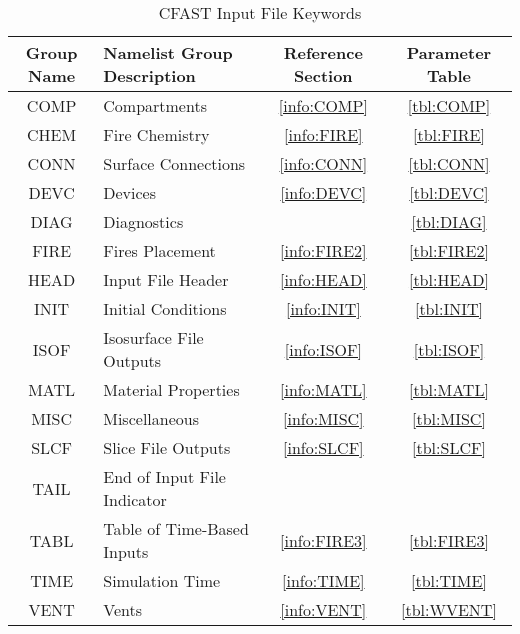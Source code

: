 \begin{table}[ht]
\begin{center}
\caption{CFAST Input File Keywords}
\label{tbl:namelistgroups}
\begin{tabular}{|c|l|c|c|}
\hline
Group Name   & Namelist Group Description     & Reference Section & Parameter Table  \\ \hline
{\ct COMP}   & Compartments                   & \ref{info:COMP}   & \ref{tbl:COMP}   \\ \hline
{\ct CHEM}   & Fire Chemistry                 & \ref{info:FIRE}   & \ref{tbl:FIRE}   \\ \hline
{\ct CONN}   & Surface Connections            & \ref{info:CONN}   & \ref{tbl:CONN}   \\ \hline
{\ct DEVC}   & Devices                        & \ref{info:DEVC}   & \ref{tbl:DEVC}   \\ \hline
{\ct DIAG}   & Diagnostics                    &                   & \ref{tbl:DIAG}   \\ \hline
{\ct FIRE}   & Fires Placement                & \ref{info:FIRE2}  & \ref{tbl:FIRE2}  \\ \hline
{\ct HEAD}   & Input File Header              & \ref{info:HEAD}   & \ref{tbl:HEAD}   \\ \hline
{\ct INIT}   & Initial Conditions             & \ref{info:INIT}   & \ref{tbl:INIT}   \\ \hline
{\ct ISOF}   & Isosurface File Outputs        & \ref{info:ISOF}   & \ref{tbl:ISOF}   \\ \hline
{\ct MATL}   & Material Properties            & \ref{info:MATL}   & \ref{tbl:MATL}   \\ \hline
{\ct MISC}   & Miscellaneous                  & \ref{info:MISC}   & \ref{tbl:MISC}   \\ \hline
{\ct SLCF}   & Slice File Outputs             & \ref{info:SLCF}   & \ref{tbl:SLCF}   \\ \hline
{\ct TAIL}   & End of Input File Indicator    &                   &                  \\ \hline
{\ct TABL}   & Table of Time-Based Inputs     & \ref{info:FIRE3}  & \ref{tbl:FIRE3}  \\ \hline
{\ct TIME}   & Simulation Time                & \ref{info:TIME}   & \ref{tbl:TIME}   \\ \hline
{\ct VENT}   & Vents                          & \ref{info:VENT}   & \ref{tbl:WVENT}  \\ \hline
\end{tabular}
\end{center}
\end{table}

